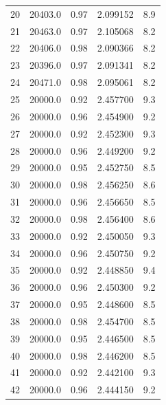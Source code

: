 \begin{table}
{\begin{tabular}{lcccc}
20  &      20403.0 &        0.97 &           2.099152 &              8.9 \\
21  &      20463.0 &        0.97 &           2.105068 &              8.2 \\
22  &      20406.0 &        0.98 &           2.090366 &              8.2 \\
23  &      20396.0 &        0.97 &           2.091341 &              8.2 \\
24  &      20471.0 &        0.98 &           2.095061 &              8.2 \\
25  &      20000.0 &        0.92 &           2.457700 &              9.3 \\
26  &      20000.0 &        0.96 &           2.454900 &              9.2 \\
27  &      20000.0 &        0.92 &           2.452300 &              9.3 \\
28  &      20000.0 &        0.96 &           2.449200 &              9.2 \\
29  &      20000.0 &        0.95 &           2.452750 &              8.5 \\
30  &      20000.0 &        0.98 &           2.456250 &              8.6 \\
31  &      20000.0 &        0.96 &           2.456650 &              8.5 \\
32  &      20000.0 &        0.98 &           2.456400 &              8.6 \\
33  &      20000.0 &        0.92 &           2.450050 &              9.3 \\
34  &      20000.0 &        0.96 &           2.450750 &              9.2 \\
35  &      20000.0 &        0.92 &           2.448850 &              9.4 \\
36  &      20000.0 &        0.96 &           2.450300 &              9.2 \\
37  &      20000.0 &        0.95 &           2.448600 &              8.5 \\
38  &      20000.0 &        0.98 &           2.454700 &              8.5 \\
39  &      20000.0 &        0.95 &           2.446500 &              8.5 \\
40  &      20000.0 &        0.98 &           2.446200 &              8.5 \\
41  &      20000.0 &        0.92 &           2.442100 &              9.3 \\
42  &      20000.0 &        0.96 &           2.444150 &              9.2 \\

\end{tabular}}
\end{table}
